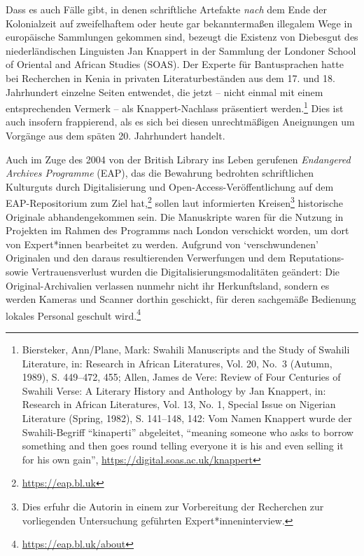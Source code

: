 \documentclass[a4paper,
fontsize=11pt,
oneside,
numbers=noperiodatend,
parskip=half-,
bibliography=totoc,
final
]{scrartcl}
\begin{document}
Dass es auch Fälle gibt, in denen schriftliche Artefakte \emph{nach} dem
Ende der Kolonialzeit auf zweifelhaftem oder heute gar bekanntermaßen
illegalem Wege in europäische Sammlungen gekommen sind, bezeugt die
Existenz von Diebesgut des niederländischen Linguisten Jan Knappert in
der Sammlung der Londoner School of Oriental and African Studies (SOAS).
Der Experte für Bantusprachen hatte bei Recherchen in Kenia in privaten
Literaturbeständen aus dem 17. und 18. Jahrhundert einzelne Seiten
entwendet, die jetzt -- nicht einmal mit einem entsprechenden Vermerk --
als Knappert-Nachlass präsentiert werden.\footnote{Biersteker,
  Ann/Plane, Mark: Swahili Manuscripts and the Study of Swahili
  Literature, in: Research in African Literatures, Vol. 20, No.~3
  (Autumn, 1989), S. 449--472, 455; Allen, James de Vere: Review of Four
  Centuries of Swahili Verse: A Literary History and Anthology by Jan
  Knappert, in: Research in African Literatures, Vol. 13, No. 1, Special
  Issue on Nigerian Literature (Spring, 1982), S. 141--148, 142: Vom
  Namen Knappert wurde der Swahili-Begriff \enquote{kinaperti}
  abgeleitet, \enquote{meaning someone who asks to borrow something and
  then goes round telling everyone it is his and even selling it for his
  own gain}, \url{https://digital.soas.ac.uk/knappert}} Dies ist auch
insofern frappierend, als es sich bei diesen unrechtmäßigen Aneignungen
um Vorgänge aus dem späten 20. Jahrhundert handelt.

Auch im Zuge des 2004 von der British Library ins Leben gerufenen
\emph{Endangered Archives Programme} (EAP), das die Bewahrung bedrohten
schriftlichen Kulturguts durch Digitalisierung und
Open-Access-Veröffentlichung auf dem EAP-Repositorium zum Ziel
hat,\footnote{\url{https://eap.bl.uk}} sollen laut informierten
Kreisen\footnote{Dies erfuhr die Autorin in einem zur Vorbereitung der
  Recherchen zur vorliegenden Untersuchung geführten
  Expert*inneninterview.} historische Originale abhandengekommen sein.
Die Manuskripte waren für die Nutzung in Projekten im Rahmen des
Programms nach London verschickt worden, um dort von Expert*innen
bearbeitet zu werden. Aufgrund von \enquote*{verschwundenen} Originalen
und den daraus resultierenden Verwerfungen und dem Reputations- sowie
Vertrauensverlust wurden die Digitalisierungsmodalitäten geändert: Die
Original-Archivalien verlassen nunmehr nicht ihr Herkunftsland, sondern
es werden Kameras und Scanner dorthin geschickt, für deren sachgemäße
Bedienung lokales Personal geschult wird.\footnote{\url{https://eap.bl.uk/about}}
\end{document}
